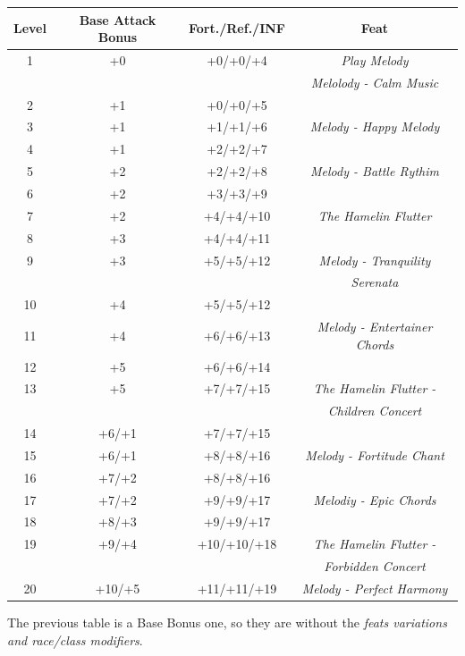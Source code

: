 \documentclass[ letterpaper,12pt]{article}
\begin{document}
{\begin{center} \begin{tabular}{|c||c|c|c|}
\hline
{\bf Level}&{\bf Base Attack Bonus}&{\bf Fort./Ref./INF}&{\bf Feat}\\
\hline
1&+0&+0/+0/+4&{\it Play Melody}\\
&&&{\it Melolody - Calm Music}\\
\hline
2&+1&+0/+0/+5&\\
\hline
3&+1&+1/+1/+6&{\it Melody - Happy Melody}\\
\hline
4&+1&+2/+2/+7&\\
\hline
5&+2&+2/+2/+8&{\it Melody - Battle Rythim}\\
\hline
6&+2&+3/+3/+9&\\
\hline
7&+2&+4/+4/+10&{\it The Hamelin Flutter}\\
\hline
8&+3&+4/+4/+11&\\
\hline
9&+3&+5/+5/+12&{\it Melody - Tranquility}\\
 & & & {\it Serenata}\\
\hline
10&+4&+5/+5/+12&\\
\hline
11&+4&+6/+6/+13&{\it Melody - Entertainer Chords}\\
\hline
12&+5&+6/+6/+14&\\
\hline
13&+5&+7/+7/+15&{\it The Hamelin Flutter -}\\
&&&{\it Children Concert}\\
\hline
14&+6/+1&+7/+7/+15&\\
\hline
15&+6/+1&+8/+8/+16&{\it Melody - Fortitude Chant}\\
\hline
16&+7/+2&+8/+8/+16&\\
\hline
17&+7/+2&+9/+9/+17&{\it Melodiy - Epic Chords}\\
\hline
18&+8/+3&+9/+9/+17&\\
\hline
19&+9/+4&+10/+10/+18&{\it The Hamelin Flutter -}\\
&&&{\it Forbidden Concert}\\
\hline
20&+10/+5&+11/+11/+19&{\it Melody - Perfect Harmony}\\
\hline
\end{tabular} \end{center}

The previous table is a Base Bonus one, so they are without the {\it feats variations and race/class modifiers}.\\

}
\end{document}
